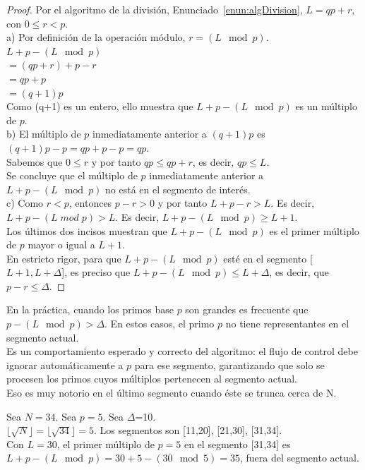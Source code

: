 \begin{proof} Por el algoritmo de la división, Enunciado~\ref{enun:algDivision}, $L=qp+r$, con $0 \leq r<p$.\\
a) Por definición de la operación módulo, $r=(L \mod p)$.\\
$L+p-(L \mod p)$ \\
$= (qp+r)+p-r$ \\
$=qp+p$ \\
$=(q+1)p$ \\
Como (q+1) es un entero, ello muestra que $L+p-(L \mod p)$ es un múltiplo de $p$.\\
b) El múltiplo de $p$ inmediatamente anterior a $(q+1)p$ es $(q+1)p-p =qp+p-p=qp$.\\
Sabemos que $0 \leq r$ y por tanto $qp \leq qp+r$, es decir,  $qp \leq L$.\\
Se concluye que el múltiplo de $p$ inmediatamente anterior a $L+p-(L \mod p)$ no está en el segmento de interés.\\
c) Como $r<p$, entonces $p-r>0$ y por tanto $L+p-r>L$. Es decir, $L+p-(L \; mod \; p)>L$. Es decir, $L+p-(L \mod p) \geq L+1$.\\
Los últimos dos incisos muestran que $L+p - (L \mod p)$ es el primer múltiplo de $p$ mayor o igual a $L+1$.\\
En estricto rigor, para que $L+p-(L \mod p)$ esté en el segmento [$L+1,L+\Delta$], es preciso que  $L+p-(L \mod p) \leq L+\Delta$, es decir, que $p-r \leq \Delta$.
\end{proof}

En la práctica, cuando los primos base $p$ son grandes es frecuente que $p-(L \mod p) > \Delta$. En estos casos, el primo $p$ no tiene representantes en el segmento actual. \\
Es un comportamiento esperado y correcto del algoritmo: el flujo de control debe ignorar automáticamente a $p$ para ese segmento, garantizando que solo se procesen los primos cuyos múltiplos pertenecen al segmento actual.\\
Eso es muy notorio en el último segmento cuando éste se trunca cerca de N.

\begin{ejemplo}
Sea $N=34$. Sea $p=5$. Sea $\Delta$=10.\\
$\lfloor \sqrt{N} \rfloor = \lfloor \sqrt{34} \rfloor =  5$.
Los segmentos son [11,20], [21,30], [31,34].\\
Con $L=30$, el primer múltiplo de $p=5$ en el segmento [31,34] es $L+p-(L \mod p)=30+5-(30 \mod 5) =  35$, fuera del segmento actual.
\end{ejemplo}


